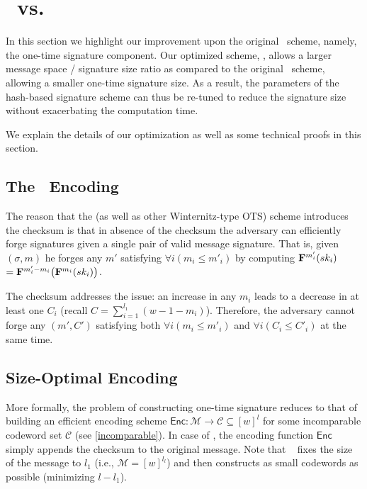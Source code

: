 \section{\SPHINCSA\ vs. \SPHINCSP} \label{sec:balanced wotsp}\label{sec:wots-optimization}

In this section we highlight our improvement upon the original \SPHINCSP\ scheme, namely, the one-time signature component.
Our optimized scheme, \WOTSCS, allows a larger message space / signature size ratio as compared to the original \WOTSP\ scheme, allowing a smaller one-time signature size. As a result, the parameters of the hash-based signature scheme can thus be re-tuned to reduce the signature size without exacerbating the computation time.

We explain the details of our optimization as well as some technical proofs in this section.

\subsection{The \WOTSP~Encoding}

The reason that the \WOTSP (as well as other Winternitz-type OTS) scheme introduces the checksum is that in absence of the checksum the adversary can efficiently forge signatures given a single pair of valid message signature. That is, given $(\sigma,m)$ he forges any $m'$ satisfying $\forall i(m_i\leq m'_i)$ by computing $\mathbf{F}^{m'_i}(sk_i)$ $=\mathbf{F}^{m'_i-m_i}\big( \mathbf{F}^{m_i}(sk_i)\big)$.

The checksum addresses the issue: an increase in any $m_i$ leads to a decrease in at least one $C_i$ (recall $C=\sum_{i=1}^{l_1}(w-1-m_i)$). Therefore, the adversary cannot forge any $(m',C')$ satisfying both $\forall i(m_i\leq m'_i)$ and $\forall i(C_i\leq C'_i)$ at the same time.






\subsection{Size-Optimal Encoding}

More formally, the problem of constructing one-time signature reduces to that of building an efficient encoding scheme $\mathsf{Enc}:\mathcal{M}\rightarrow \mathcal{C}\subseteq[w]^{l}$ for some incomparable codeword set $\mathcal{C}$ (see \cref{incomparable}). In case of \WOTSP, the encoding function $\mathsf{Enc}$ simply appends the checksum to the original message. Note that \WOTSP~ fixes the size of the message to $l_1$ (i.e., $\mathcal{M}=[w]^{l_l}$) and then constructs as small codewords as possible (minimizing $l-l_1$). 





